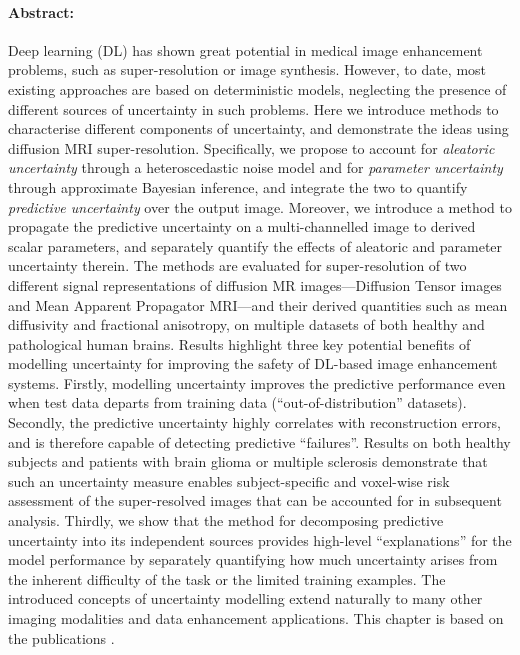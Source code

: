 \paragraph{Abstract: }
Deep learning (DL) has shown great potential in medical image enhancement problems, such as super-resolution or image synthesis. However, to date, most existing approaches are based on deterministic models, neglecting the presence of different sources of uncertainty in such problems. Here we introduce methods to characterise different components of uncertainty, and demonstrate the ideas using diffusion MRI super-resolution.  Specifically, we propose to account for \textit{aleatoric uncertainty} through a heteroscedastic noise model and for \textit{parameter uncertainty} through approximate Bayesian inference, and integrate the two to quantify \textit{predictive uncertainty} over the output image. Moreover, we introduce a method to propagate the predictive uncertainty on a multi-channelled image to derived scalar parameters, and separately quantify the effects of aleatoric and parameter uncertainty therein. The methods are evaluated for super-resolution of two different signal representations of diffusion MR images---Diffusion Tensor images and Mean Apparent Propagator MRI---and their derived quantities such as mean diffusivity and fractional anisotropy, on multiple datasets of both healthy and pathological human brains. Results highlight three key potential benefits of modelling uncertainty for improving the safety of DL-based image enhancement systems. Firstly, modelling uncertainty improves the predictive performance even when test data departs from training data (``out-of-distribution'' datasets). Secondly, the predictive uncertainty highly correlates with reconstruction errors, and is therefore capable of detecting predictive ``failures''. Results on both healthy subjects and patients with brain glioma or multiple sclerosis demonstrate that such an uncertainty measure enables subject-specific and voxel-wise risk assessment of the super-resolved images that can be accounted for in subsequent analysis. Thirdly, we show that the method for decomposing predictive uncertainty into its independent sources provides high-level ``explanations'' for the model performance by separately quantifying how much uncertainty arises from the inherent difficulty of the task or the limited training examples. The introduced concepts of uncertainty modelling extend naturally to many other imaging modalities and data enhancement applications. This chapter is based on the publications \cite{tanno2017bayesian,tannonimg2019}. 
